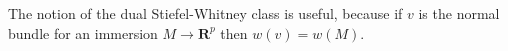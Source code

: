 The notion of the dual Stiefel-Whitney class is useful, because if $v$ is the normal bundle for an immersion $M \rightarrow \mathbf{R}^p$ then $w(v) = w(M)$.
